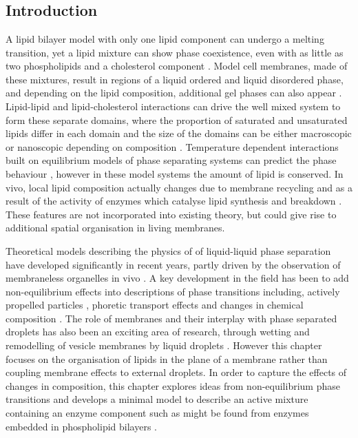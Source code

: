 \chapter{\label{ch:2-cips}\chcips}

\minitoc

\section{Introduction}

A lipid bilayer model with only one lipid component can undergo a melting transition, yet a lipid mixture can show phase coexistence, even with as little as two phospholipids and a cholesterol component \cite{elson_phase_2010}. Model cell membranes, made of these mixtures, result in regions of a liquid ordered and liquid disordered phase, and depending on the lipid composition, additional gel phases can also appear \cite{sych_how_2021, aufderhorst-roberts_three-phase_2017}. Lipid-lipid and lipid-cholesterol interactions can drive the well mixed system to form these separate domains, where the proportion of saturated and unsaturated lipids differ in each domain and the size of the domains can be either macroscopic or nanoscopic depending on composition \cite{feigenson_phase_2009}. Temperature dependent interactions built on equilibrium models of phase separating systems can predict the phase behaviour \cite{wolff_thermodynamic_2011}, however in these model systems the amount of lipid is conserved. In vivo, local lipid composition actually changes due to membrane recycling and as a result of the activity of enzymes which catalyse lipid synthesis and breakdown \cite{feigenson_phase_2009}. These features are not incorporated into existing theory, but could give rise to additional spatial organisation in living membranes.

Theoretical models describing the physics of of liquid-liquid phase separation have developed significantly in recent years, partly driven by the observation of membraneless organelles in vivo \cite{shin_liquid_2017}. A key development in the field has been to add non-equilibrium effects into descriptions of phase transitions including, actively propelled particles \cite{cates_motility-induced_2015}, phoretic transport effects \cite{agudo-canalejo_active_2019} and changes in chemical composition \cite{weber_drops_2021, li_non-equilibrium_2020}. The role of membranes and their interplay with phase separated droplets has also been an exciting area of research, through wetting and remodelling of vesicle membranes by liquid droplets \cite{mangiarotti_wetting_2023}. However this chapter focuses on the organisation of lipids in the plane of a membrane rather than coupling membrane effects to external droplets. In order to capture the effects of changes in composition, this chapter explores ideas from non-equilibrium phase transitions and develops a minimal model to describe an active mixture containing an enzyme component such as might be found from enzymes embedded in phospholipid bilayers \cite{alberts_molecular_2008}.

